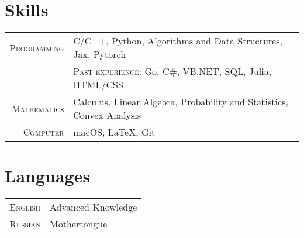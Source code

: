 \section{Skills}

\begin{tabular}{rl}
	\textsc{Programming} & C/C++, Python, Algorithms and Data Structures, Jax, Pytorch\\
	& \textsc{Past experience:} Go, C\#, VB.NET, SQL, Julia, HTML/CSS\\
	\textsc{Mathematics} & Calculus, Linear Algebra, Probability and Statistics, Convex Analysis\\
	\textsc{Computer} & macOS, LaTeX, Git\\
\end{tabular}

\section{Languages}

\begin{tabular}{rl}
	\textsc{English} & Advanced Knowledge \\
	\textsc{Russian} & Mothertongue\\
\end{tabular}